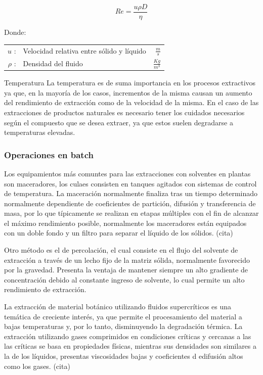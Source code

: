 \documentclass[11pt,a4paper]{article}
\begin{document}
\begin{descriptionB}
		\begin{equation}
			Re = \frac{u \rho D}{\eta}\label{Re}
		\end{equation}

		Donde:
		\begin{center}	
		\begin{tabular}{ rlr}
			$u$ :	& Velocidad relativa entre sólido y líquido &$\frac{m}{s}$ \\
			$\rho$ :& Densidad del fluido  &$ \frac{Kg}{m^{3}}$ \\
		\end{tabular}
		\end{center}
	\item[Temperatura]
		La temperatura es de suma importancia en los procesos extractivos ya que, en la mayoría de los casos, incrementos de la misma causan un aumento del rendimiento de extracción como de la velocidad de la misma. En el caso de las extracciones de productos naturales es necesario tener los cuidados necesarios según el compuesto que se desea extraer, ya que estos suelen degradarse a temperaturas elevadas.

\end{descriptionB}

\subsubsection{Operaciones en batch}

Los equipamientos más comuntes para las extracciones con solventes en plantas son maceradores, los culaes consisten en tanques agitados con sistemas de control de temperatura. La maceración normalmente finaliza tras un tiempo determinado normalmente dependiente de coeficientes de partición, difusión y transferencia de masa, por lo que típicamente se realizan en etapas múltiples con el fin de alcanzar el máximo rendimiento posible, normalmente los maceradores están equipados con un doble fondo y un filtro para separar el líquido de los sólidos. \cite{Kassing 2009} (cita)

Otro método es el de percolación, el cual consiste en el flujo del solvente de extracción a través de un lecho fijo de la matriz sólida, normalmente favorecido por la gravedad. Presenta la ventaja de mantener siempre un alto gradiente de concentración debido al constante ingreso de solvente, lo cual permite un alto rendimiento de extracción.

La extracción de material botánico utilizando fluidos supercríticos es una temática de creciente interés, ya que permite el procesamiento del material a bajas temperaturas y, por lo tanto, disminuyendo la degradación térmica. La extracción utilizando gases comprimidos en condiciones críticas y cercanas a las las críticas se basa en propiedades físicas, mientras sus densidades son similares a la de los líquidos, presentas viscosidades bajas y coeficientes d edifusión altos como los gases. \cite{Kassing 2009} (cita)
\end{document}
